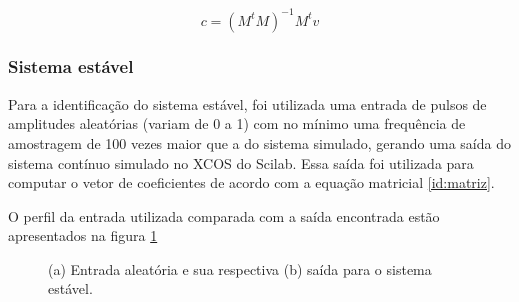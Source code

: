 \begin{equation} \label{id:matriz}
c = (M^tM)^{-1}M^t v 
\end{equation}

\subsubsection{Sistema estável}

Para a identificação do sistema estável, foi utilizada uma entrada de pulsos de amplitudes aleatórias (variam de 0 a 1) com no mínimo uma frequência de amostragem de 100 vezes maior que a do sistema simulado, gerando uma saída do sistema contínuo simulado no XCOS do Scilab. Essa saída foi utilizada para computar o vetor de coeficientes de acordo com a equação matricial \ref{id:matriz}.

O perfil da entrada utilizada comparada com a saída encontrada estão apresentados na figura \ref{id:est:entsai}

\begin{figure}[H]
\begin{center}
\end{center}
\caption{(a) Entrada aleatória e sua respectiva (b) saída para o sistema estável.}
\label{id:est:entsai} 
\end{figure}

